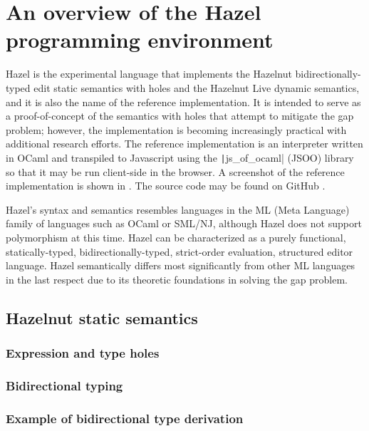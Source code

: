 \chapter{An overview of the Hazel programming environment}
\label{sec:hazel}


Hazel is the experimental language that implements the Hazelnut bidirectionally-typed edit static semantics with holes and the Hazelnut Live dynamic semantics, and it is also the name of the reference implementation. It is intended to serve as a proof-of-concept of the semantics with holes that attempt to mitigate the gap problem; however, the implementation is becoming increasingly practical with additional research efforts. The reference implementation is an interpreter written in OCaml and transpiled to Javascript using the \texttt|js_of_ocaml| (JSOO) library \cite{vouillon2014bytecode} so that it may be run client-side in the browser. A screenshot of the reference implementation is shown in  \cite{HazelDemo2022}. The source code may be found on GitHub \cite{Hazel2022}.

Hazel's syntax and semantics resembles languages in the ML (Meta Language) family of languages \cite{macqueen2020history} such as OCaml or SML/NJ, although Hazel does not support polymorphism at this time. Hazel can be characterized as a purely functional, statically-typed, bidirectionally-typed, strict-order evaluation, structured editor language. Hazel semantically differs most significantly from other ML languages in the last respect due to its theoretic foundations in solving the gap problem.

\section{Hazelnut static semantics}
\label{sec:statics}

\subsection{Expression and type holes}
\label{sec:holes}

\subsection{Bidirectional typing}
\label{sec:bidirectional_typing}

\subsection{Example of bidirectional type derivation}
\label{sec:typing_example}

